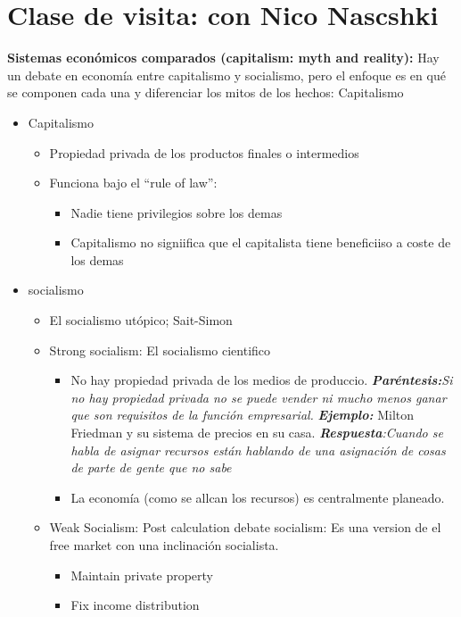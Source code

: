 \section{Clase de visita: con Nico Nascshki}
\textbf{Sistemas económicos comparados (capitalism: myth and reality):} \newline 
Hay un debate en economía entre capitalismo y socialismo, pero el enfoque es en qué se componen cada una y diferenciar los mitos de los hechos:
\newline Capitalismo
\begin{itemize}
    \item Capitalismo
\begin{itemize}
    \item Propiedad privada de los productos finales o intermedios
    \item Funciona bajo el ``rule of law'':
    \begin{itemize}
        \item Nadie tiene privilegios sobre los demas
        \item Capitalismo no signiifica que el capitalista tiene beneficiiso a coste de los demas
    \end{itemize}
\end{itemize}
    \item socialismo
    \begin{itemize}
        \item El socialismo utópico; Sait-Simon
        \item Strong socialism: El socialismo cientifico
        \begin{itemize}
            \item No hay propiedad privada de los medios de produccio. \emph{\textbf{Paréntesis:}Si no hay propiedad privada no se puede vender ni mucho menos ganar que son requisitos de la función empresarial.} \textbf{\emph{Ejemplo:}} Milton Friedman y su sistema de precios en su casa. \emph{\textbf{Respuesta}:Cuando se habla de asignar recursos están hablando de una asignación de cosas de parte de gente que no sabe}
            \item La economía (como se allcan los recursos) es centralmente planeado.
        \end{itemize}
        \item Weak Socialism: Post calculation debate socialism: Es una version de el free market con una inclinación socialista.
        \begin{itemize}
            \item Maintain private property
            \item Fix income distribution
        \end{itemize}
    \end{itemize}
\end{itemize}

